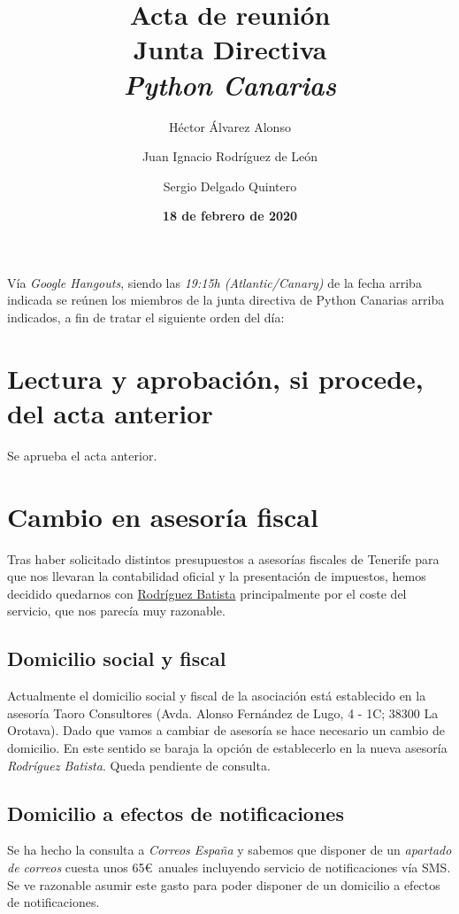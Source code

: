 \documentclass[a4paper, 12pt]{article}
\title{\huge \textbf{Acta de reunión} \\ Junta Directiva \\ \textit{Python Canarias}}
\date{\textbf{18 de febrero de 2020}}
\author{
    Héctor Álvarez Alonso \and
    Juan Ignacio Rodríguez de León \and 
    Sergio Delgado Quintero
}
\begin{document}
\renewcommand{\contentsname}{Orden del día}

\maketitle

Vía \textit{Google Hangouts}, siendo las \textit{19:15h (Atlantic/Canary)} de la fecha arriba indicada se reúnen los miembros de la junta directiva de Python Canarias arriba indicados, a fin de tratar el siguiente orden del día:

\tableofcontents

\section{Lectura y aprobación, si procede, del acta anterior}

Se aprueba el acta anterior.

\section{Cambio en asesoría fiscal}

Tras haber solicitado distintos presupuestos a asesorías fiscales de Tenerife para que nos llevaran la contabilidad oficial y la presentación de impuestos, hemos decidido quedarnos con \href{http://rodriguezbatista.com/}{Rodríguez Batista} principalmente por el coste del servicio, que nos parecía muy razonable.

\subsection{Domicilio social y fiscal}

Actualmente el domicilio social y fiscal de la asociación está establecido en la asesoría Taoro Consultores (Avda. Alonso Fernández de Lugo, 4 - 1C; 38300 La Orotava). Dado que vamos a cambiar de asesoría se hace necesario un cambio de domicilio. En este sentido se baraja la opción de establecerlo en la nueva asesoría \textit{Rodríguez Batista}. Queda pendiente de consulta.

\subsection{Domicilio a efectos de notificaciones}

Se ha hecho la consulta a \textit{Correos España} y sabemos que disponer de un \textit{apartado de correos} cuesta unos 65\euro\ anuales incluyendo servicio de notificaciones vía SMS. Se ve razonable asumir este gasto para poder disponer de un domicilio a efectos de notificaciones.
\end{document}
